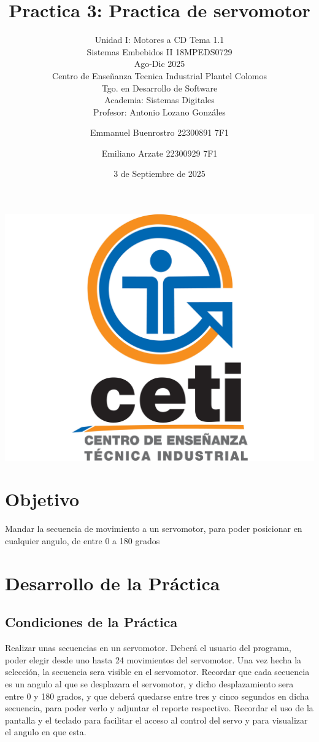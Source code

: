 \documentclass[11pt]{scrartcl}
\title {Practica 3: Practica de servomotor}
\subtitle{Unidad I: Motores a CD Tema 1.1 \\ Sistemas Embebidos II 18MPEDS0729 \\ Ago-Dic 2025 \\ Centro de Enseñanza Tecnica Industrial Plantel Colomos\\Tgo. en Desarrollo de Software \\ Academia: Sistemas Digitales \\Profesor: Antonio Lozano Gonzáles }
\date{3 de Septiembre de 2025}
\author{Emmanuel Buenrostro 22300891 7F1 \\ \and Emiliano Arzate 22300929 7F1 \\}
\begin{document}
\maketitle
\begin{center}
   \includegraphics[scale=0.15]{../../cetilogo.jpg} 
\end{center}
\newpage

\section{Objetivo}

Mandar la secuencia de movimiento a un servomotor, para poder posicionar en cualquier angulo, de entre 0 a 180 grados

\section{Desarrollo de la Práctica}

\subsection{Condiciones de la Práctica}

Realizar unas secuencias en un servomotor. Deberá el usuario del
programa, poder elegir desde uno hasta 24 movimientos del servomotor.
Una vez hecha la selección, la secuencia sera visible en el servomotor.
Recordar que cada secuencia es un angulo al que se desplazara el
servomotor, y dicho desplazamiento sera entre 0 y 180 grados, y que
deberá quedarse entre tres y cinco segundos en dicha secuencia, para
poder verlo y adjuntar el reporte respectivo. 
Recordar el uso de la
pantalla y el teclado para facilitar el acceso al control del servo y
para visualizar el angulo en que esta.
\end{document}
